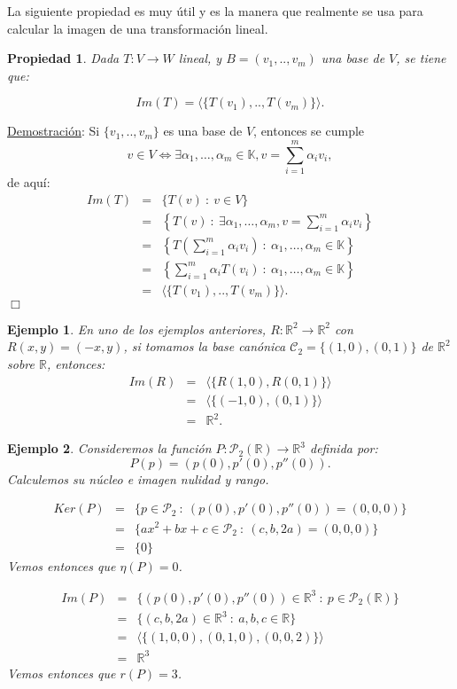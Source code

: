 \documentclass[12pt]{book}
\newtheorem{prop}{Propiedad}
\newtheorem{ejem}{Ejemplo}
\def\R{\mathbb{R}}
\def\K{\mathbb{K}}
\def\P{\mathcal{P}}
\def\Ccal{\mathcal{C}}
\begin{document}
La siguiente propiedad es muy útil y es la manera que realmente se usa para calcular la imagen de una transformación lineal.

\begin{prop}\label{teo:imagen}
Dada $T:V\rightarrow W$ lineal, y $B=(v_1,..,v_m)$ una base de $V$, se tiene que:

$$ Im(T)=\langle \{T(v_1),..,T(v_m)\}\rangle.$$
\end{prop}

\underline{Demostración}: Si $\{v_1,..,v_m\}$ es una base de $V$, entonces se cumple
$$v\in V\Leftrightarrow \exists \alpha_1,\dots,\alpha_m\in\K, v=\sum_{i=1}^m \alpha_i v_i, $$
de aqu\'i:
\begin{eqnarray*}
Im(T)&=&\{ T(v)\ :\ v\in V\}\\
&=&\left\{ T(v)\ :\ \exists \alpha_1,\dots,\alpha_m, v=\sum_{i=1}^m\alpha_i v_i\right\}\\
&=&\left\{ T\left(\sum_{i=1}^m \alpha_iv_i\right)\ :\  \alpha_1,\dots,\alpha_m\in\K\right\}\\
&=&\left\{ \sum_{i=1}^m \alpha_iT(v_i)\ :\  \alpha_1,\dots,\alpha_m\in\K\right\}\\
&=&\langle\{T(v_1),..,T(v_m)\}\rangle.
\end{eqnarray*}
\hfill $\Box$\\

\begin{ejem}{\em
En uno de los ejemplos anteriores, $R:\R^2\rightarrow \R^2$ con $R(x,y)=(-x,y)$, si tomamos la base canónica $\Ccal_2=\{(1,0),(0,1)\}$ de $\R^2$ sobre $\R$, entonces:
\begin{eqnarray*}
Im(R)&=&\langle\{ R(1,0),R(0,1)\}\rangle\\
&=&\langle\{(-1,0),(0,1)\}\rangle\\
&=& \R^2.
\end{eqnarray*}
}
\end{ejem}

\begin{ejem}\label{parabola}
Consideremos la función  $P:\P_2(\R)\rightarrow \R^3$ definida por:
$$ P(p)=(p(0),p'(0),p''(0)).$$
Calculemos su núcleo e imagen nulidad y rango.
{\em
\begin{eqnarray*}
Ker(P)&=&\{p\in\P_2\ :\ (p(0),p'(0),p''(0))=(0,0,0)\}\\
&=&\{ax^2+bx+c\in\P_2\ :\ (c,b,2a)=(0,0,0)\}\\
&=&\{0\}
\end{eqnarray*}
Vemos entonces que $\eta(P)=0$.

\begin{eqnarray*}
Im(P)&=&\{(p(0),p'(0),p''(0))\in\R^3\ :\ p\in \P_2(\R)\}\\
&=&\{(c,b,2a)\in\R^3\ :\ a,b,c\in\R\}\\
&=&\langle\{(1,0,0),(0,1,0),(0,0,2)\}\rangle\\
&=&\R^3
\end{eqnarray*}
Vemos entonces que $r(P)=3$.
}
\end{ejem}
\end{document}
